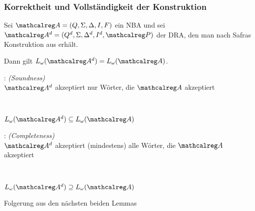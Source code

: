   \newlength{\Danngilt}
  \settowidth{\Danngilt}{Dann gilt}
    \begin{frame}
      \frametitle{Korrektheit und Vollständigkeit der Konstruktion}

      \begin{Lemma}
        Sei $\Aut{A} = (Q,\Sigma,\Delta,I,F)$ ein NBA
        und sei $\Aut{A}^d = (Q^d,\Sigma,\Delta^d,I^d,\calP)$ der DRA,
        den man nach Safras Konstruktion aus  erhält.
        \par\smallskip
        Dann gilt $L_\omega(\Aut{A}^d) = L_\omega(\Aut{A})$.
        \label{lem:soundness+completeness_safra}
      \end{Lemma}

      \par\bigskip
      : \hfill \emph{(Soundness)}\\
      $\Aut{A}^d$ akzeptiert nur Wörter, die $\Aut{A}$ akzeptiert
      \par\smallskip
      \parbox{\Danngilt}{~} $L_\omega(\Aut{A}^d) \subseteq L_\omega(\Aut{A})$

      \par\bigskip
      : \hfill \emph{(Completeness)}\\
      $\Aut{A}^d$ akzeptiert (mindestens) alle Wörter, die $\Aut{A}$ akzeptiert
      \par\smallskip
      \parbox{\Danngilt}{~} $L_\omega(\Aut{A}^d) \supseteq L_\omega(\Aut{A})$

      \par\bigskip
       Folgerung aus den nächsten beiden Lemmas
      
    \end{frame}

